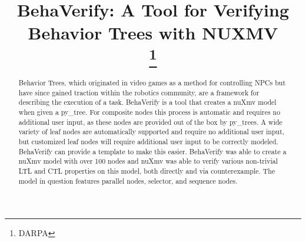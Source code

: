 \documentclass[conference]{IEEEtran}
\begin{document}
\title{BehaVerify: A Tool for Verifying Behavior Trees with NUXMV\\
\thanks{DARPA}
}

\author{
}

\maketitle

\begin{abstract}
Behavior Trees, which originated in video games as a method for controlling NPCs but have since gained traction within the robotics community, are a framework for describing the execution of a task. BehaVerify is a tool that creates a nuXmv model when given a py\_tree. For composite nodes this process is automatic and requires no additional user input, as these nodes are provided out of the box by py\_trees. A wide variety of leaf nodes are automatically supported and require no additional user input, but customized leaf nodes will require additional user input to be correctly modeled. BehaVerify can provide a template to make this easier. BehaVerify was able to create a nuXmv model with over 100 nodes and nuXmv was able to verify various non-trivial LTL and CTL properties on this model, both directly and via counterexample. The model in question features parallel nodes, selector, and sequence nodes.
\end{abstract}
\end{document}
